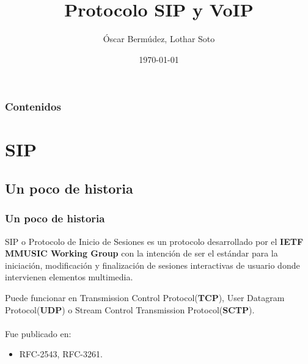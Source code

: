 \documentclass{beamer}
\title[Protocolo SIP y VoIP]{Protocolo SIP y VoIP} %
\author{Óscar Bermúdez, Lothar Soto} %
\institute[UGR] %
{
  Universidad de Granada \\ %
  \medskip
  \textit{lsotpal@correo.ugr.es\\
  oscarbg@correo.ugr.es} %
}
\date{\today} %
\begin{document}
\begin{frame}
\titlepage %
\end{frame}

\begin{frame}
  \frametitle{Contenidos} %
  \tableofcontents
\end{frame}




\section{SIP} %

\subsection{Un poco de historia} %
\begin{frame}
\frametitle{Un poco de historia}
SIP o Protocolo de Inicio de Sesiones es un protocolo desarrollado por el \textbf{IETF MMUSIC Working Group} con la intención de ser el estándar para la iniciación, modificación y finalización de sesiones interactivas de usuario donde intervienen elementos multimedia.
	
	Puede funcionar en Transmission Control Protocol(\textbf{TCP}), User Datagram Protocol(\textbf{UDP}) o Stream Control Transmission Protocol(\textbf{SCTP}).\\~\\
	Fue publicado en:
	\begin{itemize}
	\item RFC-2543, RFC-3261.
	\end{itemize}
\end{frame}
\end{document}
